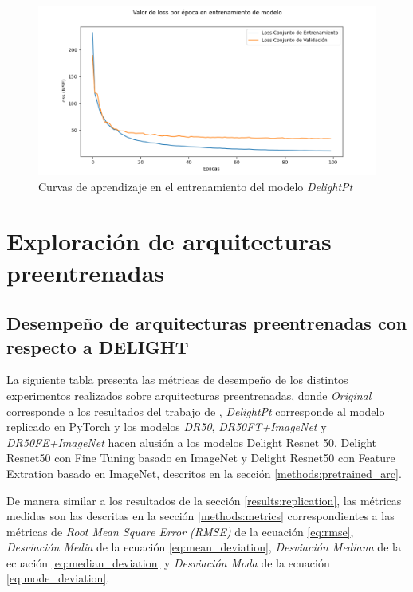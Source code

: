 \documentclass[../tesis.tex]{subfiles}
\begin{document}
\begin{figure}[h]
    \centering
    \includegraphics[width=1\linewidth]{images/results/exp1/delightpt.png}
    \caption{Curvas de aprendizaje en el entrenamiento del modelo \textit{DelightPt}}
    \label{fig:training-curves-delightpt}
\end{figure}

\section{Exploración de arquitecturas preentrenadas} \label{results:pretrained}
\subsection{Desempeño de arquitecturas preentrenadas con respecto a DELIGHT}

La siguiente tabla presenta las métricas de desempeño de los distintos experimentos realizados sobre arquitecturas preentrenadas, donde \textit{Original} corresponde a los resultados del trabajo de \cite{delight}, \textit{DelightPt} corresponde al modelo replicado en PyTorch y los modelos \textit{DR50}, \textit{DR50FT+ImageNet} y \textit{DR50FE+ImageNet} hacen alusión a los modelos Delight Resnet 50, Delight Resnet50 con Fine Tuning basado en ImageNet y Delight Resnet50 con Feature Extration basado en ImageNet, descritos en la sección \ref{methods:pretrained_arc}.\par\null\par

De manera similar a los resultados de la sección \ref{results:replication}, las métricas medidas son las descritas en la sección \ref{methods:metrics} correspondientes a las métricas de \textit{Root Mean Square Error (RMSE)} de la ecuación \ref{eq:rmse}, \textit{Desviación Media} de la ecuación \ref{eq:mean_deviation}, \textit{Desviación Mediana} de la ecuación \ref{eq:median_deviation} y \textit{Desviación Moda} de la ecuación \ref{eq:mode_deviation}.\par\null\par
\end{document}
